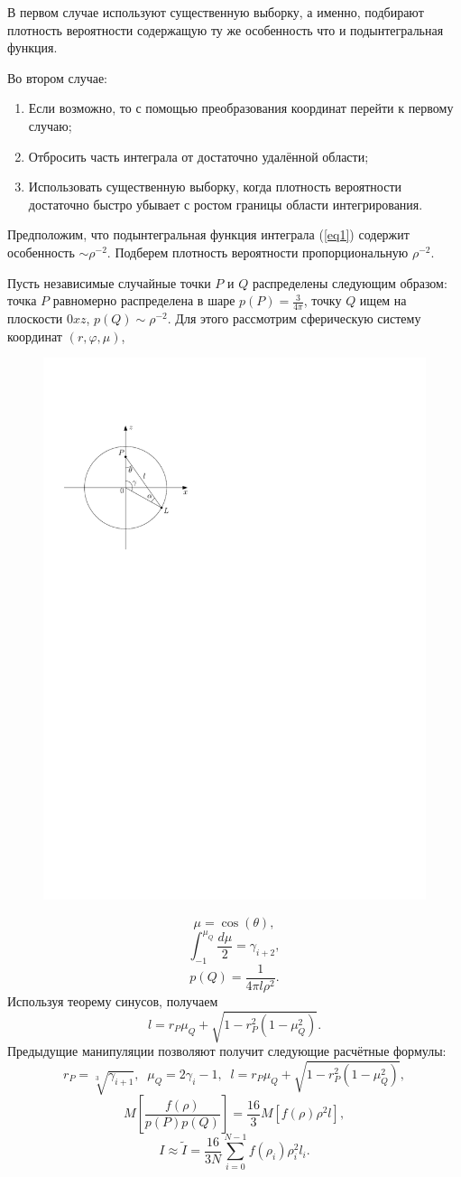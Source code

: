 \documentclass[
11pt,
master, %
subf, %
href, %
colorlinks=true, %
times, %
]{disser}
\begin{document}
В первом случае используют существенную выборку, а именно, подбирают плотность вероятности содержащую ту же особенность что и подынтегральная функция.

Во втором случае:
\begin{enumerate}
  \item Если возможно, то с помощью преобразования координат перейти к первому случаю;
  \item Отбросить часть интеграла от достаточно удалённой области;
  \item Использовать существенную выборку, когда плотность вероятности достаточно быстро убывает с ростом границы области интегрирования.
\end{enumerate}

Предположим, что подынтегральная функция интеграла (\ref{eq1}) содержит особенность $\sim \rho^{-2}$. Подберем плотность вероятности пропорциональную $\rho^{-2}$.

Пусть независимые случайные точки $P$ и $Q$ распределены следующим образом: точка $P$ равномерно распределена в шаре $p(P) = \frac{3}{4\pi}$, точку $Q$ ищем на плоскости $0xz$, $p(Q) \sim \rho^{-2}$. Для этого рассмотрим сферическую систему координат $(r,\varphi,\mu)$,
\begin{figure}[h]
  \centering
  \includegraphics[width=0.4\linewidth]{ris2}
  \caption{}\label{ris:2}
\end{figure}

$$\mu = \cos(\theta),$$
$$\int_{-1}^{\mu_Q} \frac{d\mu}{2} = \gamma_{i+2},$$
$$p(Q) = \frac{1}{4\pi l \rho^2}.$$
Используя теорему синусов, получаем
$$l = r_P \mu_Q + \sqrt{1 - r_P^2(1-\mu_Q^2)}.$$
Предыдущие манипуляции позволяют получит следующие расчётные формулы:
$$r_P = \sqrt[3]{\gamma_{i+1}},\;\; \mu_Q = 2\gamma_i - 1,\;\; l = r_P \mu_Q + \sqrt{1 - r_P^2(1-\mu_Q^2)},$$
$$M\left[\frac{f(\rho)}{p(P)p(Q)}\right] = \frac{16}{3} M[f(\rho)\rho^2l],$$
\begin{equation}\label{eq3}
  I \approx \tilde{I} = \frac{16}{3N}\sum_{i=0}^{N-1} f(\rho_i)\rho_i^2 l_i.
\end{equation}
\end{document}
